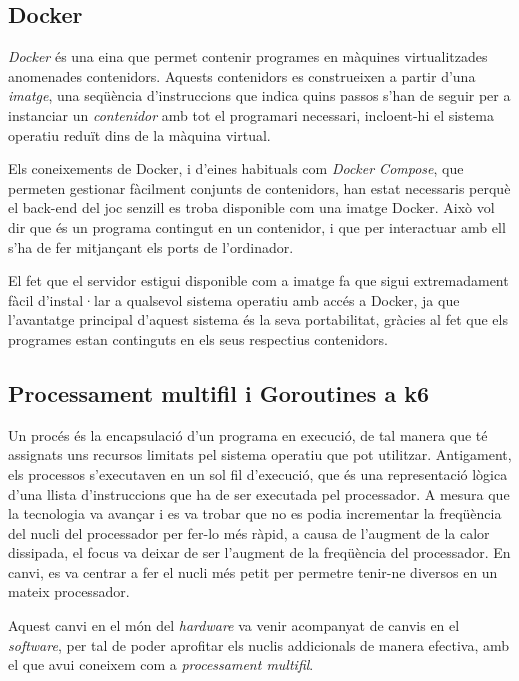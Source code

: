 \subsection{Docker}
\label{Docker}

\textit{Docker} és una eina que permet contenir programes en màquines virtualitzades anomenades contenidors. Aquests contenidors es construeixen a partir d’una \textit{imatge}, una seqüència d'instruccions que indica quins passos s'han de seguir per a instanciar un \textit{contenidor} amb tot el programari necessari, incloent-hi el sistema operatiu reduït dins de la màquina virtual. \cite{merkel_docker_nodate}

Els coneixements de Docker, i d’eines habituals com \textit{Docker Compose}, que permeten gestionar fàcilment conjunts de contenidors, han estat necessaris perquè el back-end del joc senzill es troba disponible com una imatge Docker. Això vol dir que és un programa contingut en un contenidor, i que per interactuar amb ell s'ha de fer mitjançant els ports de l'ordinador.

El fet que el servidor estigui disponible com a imatge fa que sigui extremadament fàcil d’instal·lar a qualsevol sistema operatiu amb accés a Docker, ja que l’avantatge principal d’aquest sistema és la seva portabilitat, gràcies al fet que els programes estan continguts en els seus respectius contenidors.

\subsection{Processament multifil i Goroutines a k6}
Un procés és la encapsulació d'un programa en execució, de tal manera que té assignats uns recursos limitats pel sistema operatiu que pot utilitzar. Antigament, els processos s'executaven en un sol fil d'execució, que és una representació lògica d'una llista d'instruccions que ha de ser executada pel processador. A mesura que la tecnologia va avançar i es va trobar que no es podia incrementar la freqüència del nucli del processador per fer-lo més ràpid, a causa de l'augment de la calor dissipada, el focus va deixar de ser l'augment de la freqüència del processador. En canvi, es va centrar a fer el nucli més petit per permetre tenir-ne diversos en un mateix processador.

Aquest canvi en el món del \textit{hardware} va venir acompanyat de canvis en el \textit{software}, per tal de poder aprofitar els nuclis addicionals de manera efectiva, amb el que avui coneixem com a \textit{processament multifil}.\cite{its_processes_nodate}

